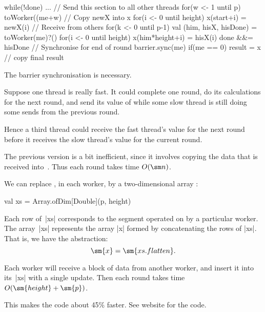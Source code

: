 
\begin{slide}

\begin{scala}
      while(!done){
        ...
        // Send this section to all other threads
        for(w <- 1 until p) toWorker((me+w)%
        // Copy newX into x
        for(i <- 0 until height) x(start+i) = newX(i)
        // Receive from others
        for(k <- 0 until p-1){
          val (him, hisX, hisDone) = toWorker(me)?()
          for(i <- 0 until height) x(him*height+i) = hisX(i)
          done &&= hisDone
        }
        // Synchronise for end of round
        barrier.sync(me)
      }
      if(me == 0) result = x // copy final result      
\end{scala}
\end{slide}



\begin{slide}

The  barrier synchronisation is necessary.

Suppose one thread is really fast.  It could complete one round, do its
calculations for the next round, and send its value of  while some
slow thread is still doing some sends from the previous round.

Hence a third thread could receive the fast thread's value for the next
round before it receives the slow thread's value for the current round.
\end{slide}


\begin{slide}

The previous version is a bit inefficient, since it involves copying the data
that is received into~.  Thus each round takes time $O(\sm n)$.

We can replace , in each worker, by a two-dimensional array
:
%
\begin{scala}
val xs = Array.ofDim[Double](p, height)
\end{scala}
%
Each row of~|xs| corresponds to the segment operated on by a particular
worker.  The array~|xs| represents the array |x| formed by concatenating the
rows of |xs|.  That is, we have the abstraction:
\[
\sm{x} = \sm{xs.flatten}.
\]

Each worker will receive a block of data from another worker, and insert it
into its~|xs| with a single update.  Then each round takes time $O(\sm{height}
+ \sm{p})$.

This makes the code about 45\% faster.  See website for the code.
\end{slide}

